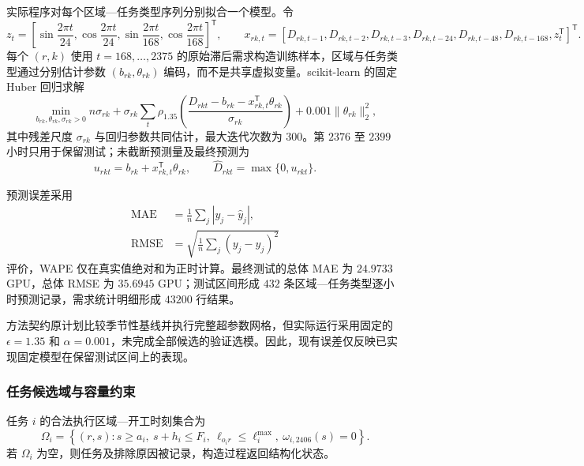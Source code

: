 实际程序对每个区域—任务类型序列分别拟合一个模型。令
\begin{equation}
z_t=\left[
\sin\frac{2\pi t}{24},
\cos\frac{2\pi t}{24},
\sin\frac{2\pi t}{168},
\cos\frac{2\pi t}{168}
\right]^{\mathsf T},\qquad
x_{rk,t}=\left[D_{rk,t-1},D_{rk,t-2},D_{rk,t-3},D_{rk,t-24},D_{rk,t-48},D_{rk,t-168},z_t^{\mathsf T}\right]^{\mathsf T}.
\end{equation}
每个 $(r,k)$ 使用 $t=168,\ldots,2375$ 的原始滞后需求构造训练样本，区域与任务类型通过分别估计参数 $(b_{rk},\theta_{rk})$ 编码，而不是共享虚拟变量。scikit-learn 的固定 Huber 回归求解
\begin{equation}
\min_{b_{rk},\theta_{rk},\sigma_{rk}>0}
 n\sigma_{rk}+\sigma_{rk}\sum_t
 \rho_{1.35}\!\left(\frac{D_{rkt}-b_{rk}-x_{rk,t}^{\mathsf T}\theta_{rk}}{\sigma_{rk}}\right)
 +0.001\lVert\theta_{rk}\rVert_2^2,
\end{equation}
其中残差尺度 $\sigma_{rk}$ 与回归参数共同估计，最大迭代次数为 $300$。第 $2376$ 至 $2399$ 小时只用于保留测试；未截断预测量及最终预测为
\begin{equation}
u_{rkt}=b_{rk}+x_{rk,t}^{\mathsf T}\theta_{rk},\qquad
\widehat D_{rkt}=\max\{0,u_{rkt}\}.
\end{equation}

预测误差采用
\begin{align}
\mathrm{MAE}&=\frac{1}{n}\sum_j|y_j-\widehat y_j|,\\
\mathrm{RMSE}&=\sqrt{\frac{1}{n}\sum_j(y_j-\widehat y_j)^2}
\end{align}
评价，WAPE 仅在真实值绝对和为正时计算。最终测试的总体 MAE 为 $24.9733$ GPU，总体 RMSE 为 $35.6945$ GPU；测试区间形成 $432$ 条区域—任务类型逐小时预测记录，需求统计明细形成 $43200$ 行结果。

方法契约原计划比较季节性基线并执行完整超参数网格，但实际运行采用固定的 $\epsilon=1.35$ 和 $\alpha=0.001$，未完成全部候选的验证选模。因此，现有误差仅反映已实现固定模型在保留测试区间上的表现。

\subsubsection{任务候选域与容量约束}

任务 $i$ 的合法执行区域—开工时刻集合为
\begin{equation}
\Omega_i=\left\{(r,s):s\ge a_i,\ s+h_i\le F_i,\
\ell_{o_ir}\le\ell_i^{\max},\ \omega_{i,2406}(s)=0\right\}.
\end{equation}
若 $\Omega_i$ 为空，则任务及排除原因被记录，构造过程返回结构化状态。

